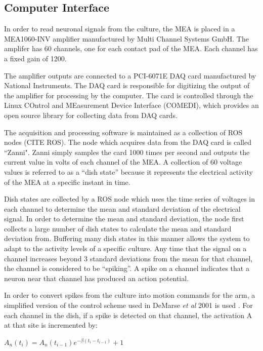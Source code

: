 \documentclass[letterpaper]{article}
\begin{document}
\subsection{Computer Interface}

In order to read neuronal signals from the culture, the MEA is placed in a MEA1060-INV amplifier manufactured by Multi Channel Systems GmbH. 
The amplifer has 60 channels, one for each contact pad of the MEA.
Each channel has a fixed gain of 1200.

The amplifier outputs are connected to a PCI-6071E DAQ card manufactured by National Instruments. 
The DAQ card is responsible for digitizing the output of the amplifier for processing by the computer. 
The card is controlled through the Linux COntrol and MEasurement Device Interface (COMEDI), which provides an open source library for collecting data from DAQ cards. 

The acquisition and processing software is maintained as a collection of ROS nodes (CITE ROS).
The node which acquires data from the DAQ card is called ``Zanni". 
Zanni simply samples the card 1000 times per second and outputs the current value in volts of each channel of the MEA. 
A collection of 60 voltage values is referred to as a ``dish state'' because it represents the electrical activity of the MEA at a specific instant in time. 

Dish states are collected by a ROS node which uses the time series of voltages in each channel to determine the mean and standard deviation of the electrical signal. 
In order to determine the mean and standard deviation, the node first collects a large number of dish states to calculate the mean and standard deviation from. 
Buffering many dish states in this manner allows the system to adapt to the activity levels of a specific culture. 
Any time that the signal on a channel increases beyond 3 standard deviations from the mean for that channel, the channel is considered to be ``spiking''. 
A spike on a channel indicates that a neuron near that channel has produced an action potential. 

In order to convert spikes from the culture into motion commands for the arm, a simplified version of the control scheme used in DeMarse \textit{et al} 2001 is used \cite{demarse2001neurally}. 
For each channel in the dish, if a spike is detected on that channel, the activation A at that site is incremented by: 

$A_n (t_i) = A_n(t_{i-1})e^{-\beta(t_i - t_{i-1})} + 1$
\end{document}
